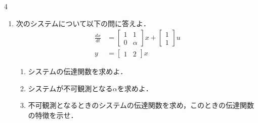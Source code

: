 \documentclass[fleqn]{article}
\renewcommand{\bmatrix}{\left[\begin{array}}
\newcommand{\ematrix}{\end{array}\right]}
\begin{document}
\begin{multicols}{4}
\begin{enumerate}
\begin{enumerate}
\item
$(m_0, m_1, m_2, k_1, k_2)=(1,1,2,1,2)$の場合，可制御であるか否かを判断せよ．
\vspace{8cm}

\end{enumerate}

\item
次のシステムについて以下の問に答えよ．
\begin{align}
	\frac{dx}{dt}
	&=	\bmatrix{cc}
			1 & 1 \\
			0 & \alpha
		\ematrix
		x
		+
		\bmatrix{c}
			1 \\
			1
		\ematrix
		u
\nonumber \\
	y 
	&=	\bmatrix{cc}
			1 & 2 
		\ematrix
		x
\nonumber 
\end{align}

\begin{enumerate}

\item 
システムの伝達関数を求めよ．
\vspace{4cm}

\item
システムが不可観測となる$\alpha$を求めよ．
\vspace{4cm}

\item
不可観測となるときのシステムの伝達関数を求め，このときの伝達関数の特徴を示せ．
\vspace{4cm}

\end{enumerate}






\end{enumerate}
\end{multicols}
\end{document}
